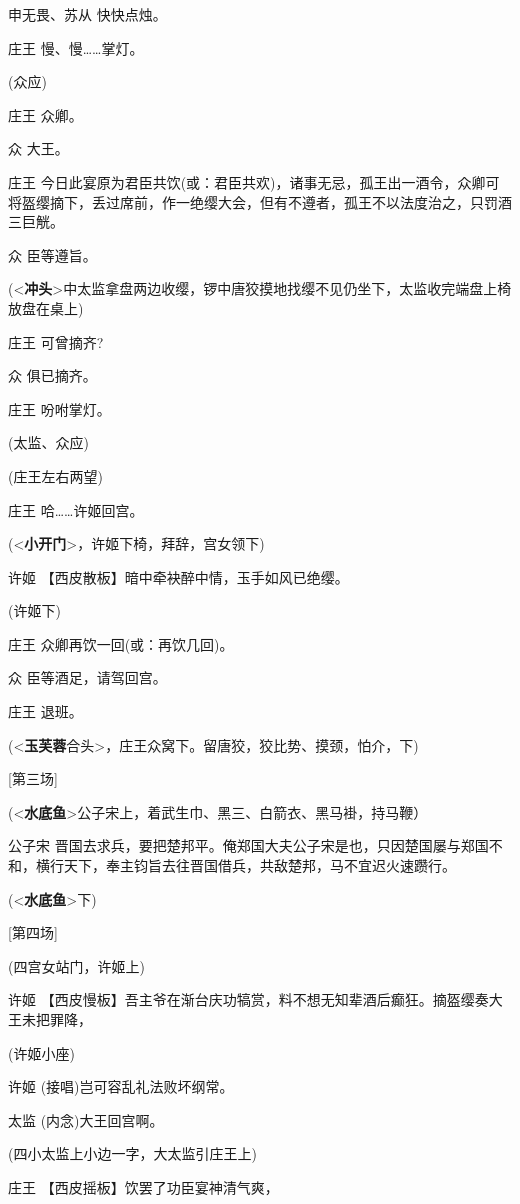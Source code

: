 申无畏、苏从 快快点烛。

庄王 慢、慢\ldots{}\ldots{}掌灯。

(众应)

庄王 众卿。

众 大王。

庄王
今日此宴原为君臣共饮(或：君臣共欢)，诸事无忌，孤王出一酒令，众卿可将盔缨摘下，丢过席前，作一绝缨大会，但有不遵者，孤王不以法度治之，只罚酒三巨觥。

众 臣等遵旨。

(\textless{}\textbf{冲头}\textgreater{}中太监拿盘两边收缨，锣中唐狡摸地找缨不见仍坐下，太监收完端盘上椅放盘在桌上)

庄王 可曾摘齐?

众 俱已摘齐。

庄王 吩咐掌灯。

(太监、众应)

(庄王左右两望)

庄王 哈\ldots{}\ldots{}许姬回宫。

(\textless{}\textbf{小开门}\textgreater{}，许姬下椅，拜辞，宫女领下)

许姬 【西皮散板】暗中牵袂醉中情，玉手如风已绝缨。

(许姬下)

庄王 众卿再饮一回(或：再饮几回)。

众 臣等酒足，请驾回宫。

庄王 退班。

(\textless{}\textbf{玉芙蓉}合头\textgreater{}，庄王众窝下。留唐狡，狡比势、摸颈，怕介，下)

{[}第三场{]}

(\textless{}\textbf{水底鱼}\textgreater{}公子宋上，着武生巾、黑三、白箭衣、黑马褂，持马鞭）

公子宋
晋国去求兵，要把楚邦平。俺郑国大夫公子宋是也，只因楚国屡与郑国不和，横行天下，奉主钧旨去往晋国借兵，共敌楚邦，马不宜迟火速躜行。

(\textless{}\textbf{水底鱼}\textgreater{}下)

{[}第四场{]}

(四宫女站门，许姬上)

许姬
【西皮慢板】吾主爷在渐台庆功犒赏，料不想无知辈酒后癫狂。摘盔缨奏大王未把罪降，

(许姬小座)

许姬 (接唱)岂可容乱礼法败坏纲常。

太监 (内念)大王回宫啊。

(四小太监上小边一字，大太监引庄王上)

庄王 【西皮摇板】饮罢了功臣宴神清气爽，

